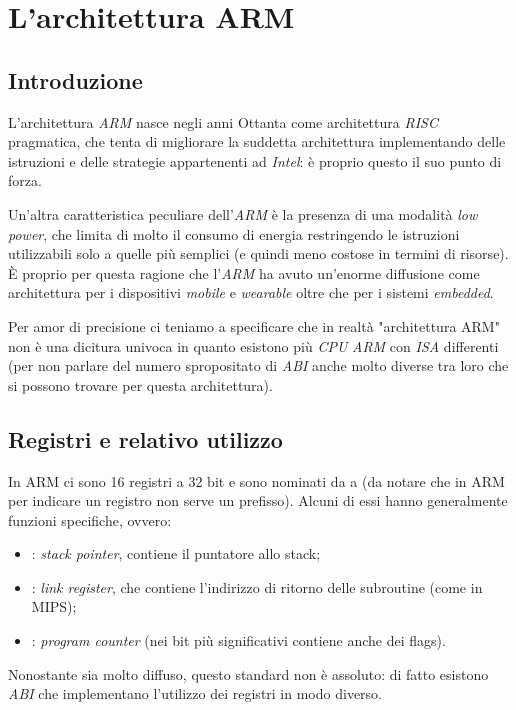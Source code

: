 \documentclass[class=book, crop=false, oneside]{standalone}
\begin{document}
\chapter{L'architettura ARM}

\section{Introduzione}
L'architettura \emph{ARM} nasce negli anni Ottanta come architettura \emph{RISC} pragmatica, che tenta di migliorare la suddetta architettura implementando delle istruzioni e delle strategie appartenenti ad \emph{Intel}: è proprio questo il suo punto di forza.

Un'altra caratteristica peculiare dell'\emph{ARM} è la presenza di una modalità \emph{low power}, che limita di molto il consumo di energia restringendo le istruzioni utilizzabili solo a quelle più semplici (e quindi meno costose in termini di risorse). È proprio per questa ragione che l'\emph{ARM} ha avuto un'enorme diffusione come architettura per i dispositivi \emph{mobile} e \emph{wearable} oltre che per i sistemi \emph{embedded}.

Per amor di precisione ci teniamo a specificare che in realtà "architettura ARM" non è una dicitura univoca in quanto esistono più \emph{CPU} \emph{ARM} con \emph{ISA} differenti (per non parlare del numero spropositato di \emph{ABI} anche molto diverse tra loro che si possono trovare per questa architettura).

\section{Registri e relativo utilizzo}
In ARM ci sono 16 registri a 32 bit e sono nominati da  a  (da notare che in ARM per indicare un registro non serve un prefisso). Alcuni di essi hanno generalmente funzioni specifiche, ovvero:

\begin{itemize}
	\item {}: \emph{stack pointer}, contiene il puntatore allo stack;
	\item {}: \emph{link register}, che contiene l'indirizzo di ritorno delle subroutine (come  in MIPS);
	\item {}: \emph{program counter} (nei bit più significativi contiene anche dei flags).
\end{itemize}
Nonostante sia molto diffuso, questo standard non è assoluto: di fatto esistono \emph{ABI} che implementano l'utilizzo dei registri in modo diverso.
\end{document}
